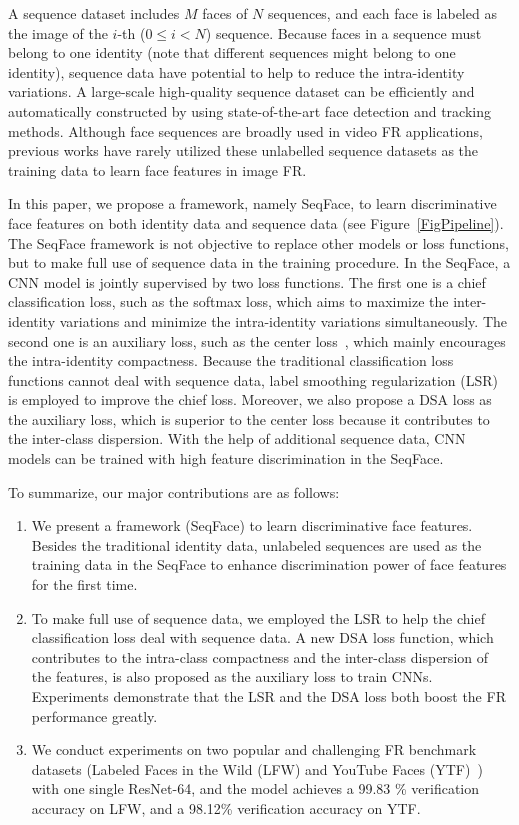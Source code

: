 \documentclass[conference]{acmsiggraph}
\begin{document}
A sequence dataset includes $M$ faces of $N$ sequences, and each face is labeled as the image of the $i$-th ($0 \leq i < N$) sequence. Because faces in a sequence must belong to one identity (note that different sequences might belong to one identity), sequence data have potential to help to reduce the intra-identity variations. A large-scale high-quality sequence dataset can be efficiently and automatically constructed by using state-of-the-art face detection and tracking methods. Although face sequences are broadly used in video FR applications, previous works have rarely utilized these unlabelled sequence datasets as the training data to learn face features in image FR.

In this paper, we propose a framework, namely SeqFace, to learn discriminative face features on both identity data and sequence data (see Figure~\ref{FigPipeline}). The SeqFace framework is not objective to replace other models or loss functions, but to make full use of sequence data in the training procedure. In the SeqFace, a CNN model is jointly supervised by two loss functions. The first one is a chief classification loss, such as the softmax loss, which aims to maximize the inter-identity variations and minimize the intra-identity variations simultaneously. The second one is an auxiliary loss, such as the center loss~\cite{centerloss}, which mainly encourages the intra-identity compactness. Because the traditional classification loss functions cannot deal with sequence data, label smoothing regularization (LSR) is employed to improve the chief loss. Moreover, we also propose a DSA loss as the auxiliary loss, which is superior to the center loss because it contributes to the inter-class dispersion. With the help of additional sequence data, CNN models can be trained with high feature discrimination in the SeqFace.

To summarize, our major contributions are as follows:

\begin{enumerate}
\item We present a framework (SeqFace) to learn discriminative face features. Besides the traditional identity data, unlabeled sequences are used as the training data in the SeqFace to enhance discrimination power of face features for the first time. 
\item To make full use of sequence data, we employed the LSR to help the chief classification loss deal with sequence data. A new DSA loss function, which contributes to the intra-class compactness and the inter-class dispersion of the features, is also proposed as the auxiliary loss to train CNNs. Experiments demonstrate that the LSR and the DSA loss both boost the FR performance greatly.
\item We conduct experiments on two popular and challenging FR benchmark datasets (Labeled Faces in the Wild (LFW) and YouTube Faces (YTF)~\cite{ytf}) with one single ResNet-64, and the model achieves a 99.83 \% verification accuracy on LFW, and a 98.12\% verification accuracy on YTF.
\end{enumerate}
\end{document}
